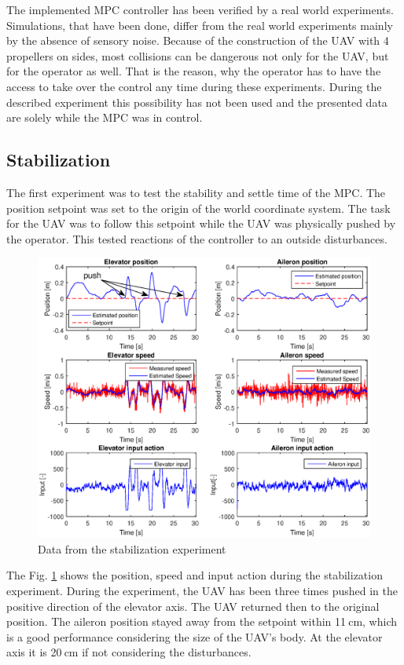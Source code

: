 \documentclass[a4paper,11pt,titlepage]{article}
\newcommand{\jed}[1]{\ensuremath{~\mathrm{#1}}}
\begin{document}
The implemented MPC controller has been verified by a real world experiments. Simulations, that have been done, differ from the real world experiments mainly by the absence of sensory noise. Because of the construction of the UAV with 4 propellers on sides, most collisions can be dangerous not only for the UAV, but for the operator as well. That is the reason, why the operator has to have the access to take over the control any time during these experiments. During the described experiment this possibility has not been used and the presented data are solely while the MPC was in control.

\subsection{Stabilization}
The first experiment was to test the stability and settle time of the MPC. The position setpoint was set to the origin of the world coordinate system. The task for the UAV was to follow this setpoint while the UAV was physically pushed by the operator. This tested reactions of the controller to an outside disturbances.


\begin{figure}[!h]
\centering
\includegraphics[width=1\textwidth]{fig/balancing.eps}
\caption{Data from the stabilization experiment}
\label{fig:stabilization}
\end{figure}

The Fig. \ref{fig:stabilization} shows the position, speed and input action during the stabilization experiment. During the experiment, the UAV has been three times pushed in the positive direction of the elevator axis. The UAV returned then to the original position. The aileron position stayed away from the setpoint within 11\jed{cm}, which is a good performance considering the size of the UAV's body. At the elevator axis it is 20\jed{cm} if not considering the disturbances.
\end{document}
